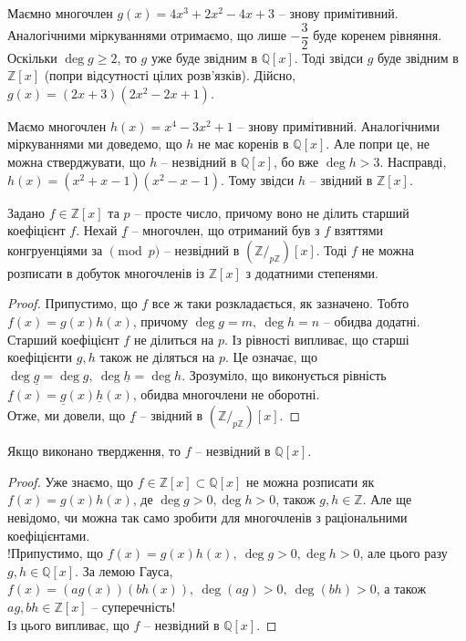 \documentclass{math_library}
\begin{document}
\begin{example}
Маємно многочлен $g(x) = 4x^3 + 2x^2 - 4x + 3$ -- знову примітивний. Аналогічними міркуваннями отримаємо, що лише $-\dfrac{3}{2}$ буде коренем рівняння. Оскільки $\deg g \geq 2$, то $g$ уже буде звідним в $\mathbb{Q}[x]$. Тоді звідси $g$ буде звідним в $\mathbb{Z}[x]$ (попри відсутності цілих розв'язків). Дійсно, $g(x) = (2x+3)(2x^2-2x+1)$.
\end{example}

\begin{example}
Маємо многочлен $h(x) = x^4 -3x^2 + 1$ -- знову примітивний. Аналогічними міркуваннями ми доведемо, що $h$ не має коренів в $\mathbb{Q}[x]$. Але попри це, не можна стверджувати, що $h$ -- незвідний в $\mathbb{Q}[x]$, бо вже $\deg h > 3$. Насправді, $h(x) = (x^2+x-1)(x^2-x-1)$. Тому звідси $h$ -- звідний в $\mathbb{Z}[x]$.
\end{example}

\begin{proposition}
Задано $f \in \mathbb{Z}[x]$ та $p$ -- просте число, причому воно не ділить старший коефіцієнт $f$. Нехай $\underline{f}$ -- многочлен, що отриманий був з $f$ взяттями конгруенціями за $\!\pmod p$ -- незвідний в $\left( \mathbb{Z}/_{p \mathbb{Z}} \right)[x]$. Тоді $f$ не можна розписати в добуток многочленів із $\mathbb{Z}[x]$ з додатними степенями.
\end{proposition}

\begin{proof}
Припустимо, що $f$ все ж таки розкладається, як зазначено. Тобто\\
$f(x) = g(x) h(x)$, причому $\deg g = m,\ \deg h = n$ -- обидва додатні.\\
Старший коефіцієнт $f$ не ділиться на $p$. Із рівності випливає, що старші коефіцієнти $g,h$ також не діляться на $p$. Це означає, що $\deg \underline{g} = \deg g,\ \deg \underline{h} = \deg h$. Зрозуміло, що виконується рівність\\
$\underline{f}(x) = \underline{g}(x) \underline{h}(x)$, обидва многочлени не оборотні.\\
Отже, ми довели, що $\underline{f}$ -- звідний в $\left( \mathbb{Z}/_{p \mathbb{Z}} \right)[x]$.
\end{proof}

\begin{corollary}
Якщо виконано твердження, то $f$ -- незвідний в $\mathbb{Q}[x]$.
\end{corollary}

\begin{proof}
Уже знаємо, що $f \in \mathbb{Z}[x] \subset \mathbb{Q}[x]$ не можна розписати як $f(x) = g(x)h(x)$, де $\deg g > 0, \deg h > 0$, також $g,h \in \mathbb{Z}$. Але ще невідомо, чи можна так само зробити для многочленів з раціональними коефіцієнтами.\\
!Припустимо, що $f(x) = g(x)h(x),\ \deg g > 0, \deg h > 0$, але цього разу $g,h \in \mathbb{Q}[x]$. За лемою Гауса, $f(x) = (ag(x)) (bh(x)),\ \deg (ag) > 0,\ \deg (bh) > 0$, а також $ag, bh \in \mathbb{Z}[x]$ -- суперечність!\\
Із цього випливає, що $f$ -- незвідний в $\mathbb{Q}[x]$.
\end{proof}
\end{document}
